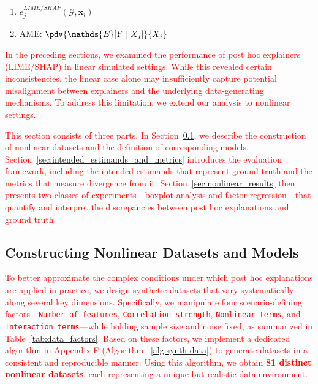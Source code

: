\documentclass[mnsc,blindrev]{informs3}
\newcommand{\bx}{\mathbf{x}}
\begin{document}
\begin{enumerate}
    \item $e^{LIME/SHAP}_j(\mathcal{G},\bx_i)$
    \item AME: $\pdv{\mathds{E}[Y\mid X_j]}{X_j}$
\end{enumerate}

\textcolor{red}{In the preceding sections, we examined the performance of post hoc explainers (LIME/SHAP) in linear simulated settings. While this revealed certain inconsistencies, the linear case alone may insufficiently capture potential misalignment between explainers and the underlying data-generating mechanisms. To address this limitation, we extend our analysis to nonlinear settings.}

\textcolor{red}{This section consists of three parts. In Section~\ref{sec:nonlinear_data_generation}, we describe the construction of nonlinear datasets and the definition of corresponding models. Section~\ref{sec:intended_estimands_and_metrics} introduces the evaluation framework, including the intended estimands that represent ground truth and the metrics that measure divergence from it. Section~\ref{sec:nonlinear_results} then presents two classes of experiments—boxplot analysis and factor regression—that quantify and interpret the discrepancies between post hoc explanations and ground truth.}

\subsection{Constructing Nonlinear Datasets and Models}
\label{sec:nonlinear_data_generation}

\textcolor{red}{To better approximate the complex conditions under which post hoc explanations are applied in practice, we design synthetic datasets that vary systematically along several key dimensions. Specifically, we manipulate four scenario-defining factors—\texttt{Number of features}, \texttt{Correlation strength}, \texttt{Nonlinear terms}, and \texttt{Interaction terms}—while holding sample size and noise fixed, as summarized in Table~\ref{tab:data_factors}. Based on these factors, we implement a dedicated algorithm in Appendix F (Algorithm ~\ref{alg:synth-data}) to generate datasets in a consistent and reproducible manner. Using this algorithm, we obtain \textbf{81 distinct nonlinear datasets}, each representing a unique but realistic data environment.}
\end{document}
